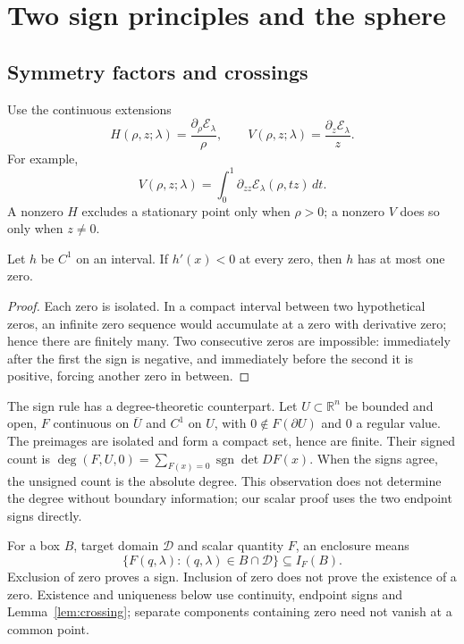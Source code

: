 \section{Two sign principles and the sphere}\label{sec:principles}

\subsection{Symmetry factors and crossings}
Use the continuous extensions
\begin{equation}\label{eq:HV}
 H(\rho,z;\lambda)=\frac{\partial_\rho\mathcal E_\lambda}{\rho},\qquad
 V(\rho,z;\lambda)=\frac{\partial_z\mathcal E_\lambda}{z}.
\end{equation}
For example,
\[
 V(\rho,z;\lambda)=\int_0^1\partial_{zz}\mathcal E_\lambda(\rho,tz)\,dt.
\]
A nonzero $H$ excludes a stationary point only when $\rho>0$; a nonzero $V$ does so only when $z\ne0$.

\begin{lemma}\label{lem:crossing}
Let $h$ be $C^1$ on an interval. If $h'(x)<0$ at every zero, then $h$ has at most one zero.
\end{lemma}
\begin{proof}
Each zero is isolated. In a compact interval between two hypothetical zeros, an infinite zero sequence would accumulate at a zero with derivative zero; hence there are finitely many. Two consecutive zeros are impossible: immediately after the first the sign is negative, and immediately before the second it is positive, forcing another zero in between.
\end{proof}

The sign rule has a degree-theoretic counterpart. Let $U\subset\mathbb R^n$ be bounded and open, $F$ continuous on $\overline U$ and $C^1$ on $U$, with $0\notin F(\partial U)$ and $0$ a regular value. The preimages are isolated and form a compact set, hence are finite. Their signed count is $\deg(F,U,0)=\sum_{F(x)=0}\operatorname{sgn}\det DF(x)$. When the signs agree, the unsigned count is the absolute degree. This observation does not determine the degree without boundary information; our scalar proof uses the two endpoint signs directly.

For a box $B$, target domain $\mathcal D$ and scalar quantity $F$, an enclosure means
\begin{equation}\label{eq:enclosure}
 \{F(q,\lambda):(q,\lambda)\in B\cap\mathcal D\}\subseteq I_F(B).
\end{equation}
Exclusion of zero proves a sign. Inclusion of zero does not prove the existence of a zero. Existence and uniqueness below use continuity, endpoint signs and Lemma~\ref{lem:crossing}; separate components containing zero need not vanish at a common point.

